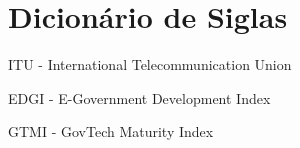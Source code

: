 \section{Dicionário de Siglas}

ITU - International Telecommunication Union

EDGI - E-Government Development Index

GTMI - GovTech Maturity Index